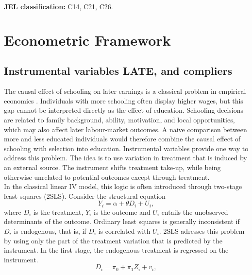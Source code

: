 \documentclass[12pt, a4paper, oneside]{article}
\theoremstyle{plain}
\theoremstyle{definition}
\begin{document}
\bigskip
\noindent\textbf{JEL classification:} C14, C21, C26.

\newpage
\tableofcontents

\newpage
\listoffigures
{}

\newpage
\listoftables
{}



\newpage
{}
\setcounter{page}{1}


\section{Econometric Framework}

\subsection{Instrumental variables LATE, and compliers}
The causal effect of schooling on later earnings is a classical problem in empirical economics
\citep{griliches1977estimating,card1993using}.
Individuals with more schooling often display higher wages, but this gap cannot be interpreted directly as the effect of education.
Schooling decisions are related to family background, ability, motivation, and local opportunities,
which may also affect later labour-market outcomes.
A naive comparison between more and less educated individuals would therefore combine the causal effect of schooling with selection into education.
Instrumental variables provide one way to address this problem. The idea is to use variation in treatment that is induced by an external source. The instrument shifts treatment take-up, while being otherwise unrelated to potential outcomes except through treatment.\\
In the classical linear IV model, this logic is often introduced through two-stage least squares (2SLS).
Consider the structural equation
\begin{equation}
    Y_i = \alpha + \theta D_i + U_i,
\end{equation}
where $D_i$ is the treatment, $Y_i$ is the outcome and $U_i$ entails the unobserved determinants of the outcome. 
Ordinary least squares is generally inconsistent if 
$D_i$ is endogenous, that is, if $D_i$ is correlated with $U_i$.
2SLS adresses this problem by using only the part of the treatment variation that is predicted by the instrument. 
In the first stage, the endogenous treatment is regressed on the instrument. \begin{equation}
D_i = \pi_0 + \pi_1 Z_i + v_i,
\end{equation}
\end{document}
